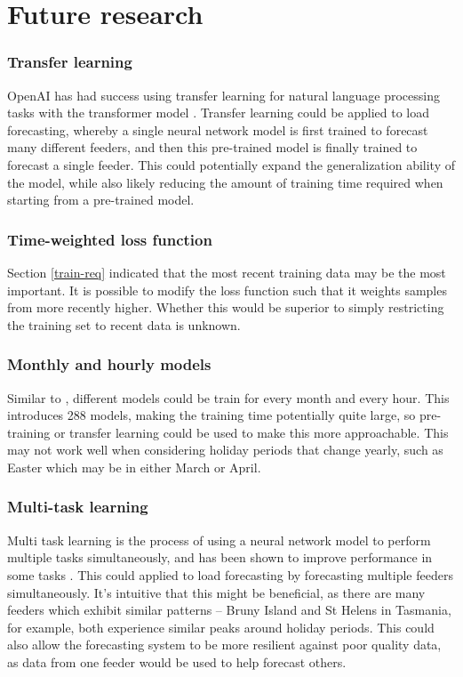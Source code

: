 \section{Future research}

\subsubsection{Transfer learning}
OpenAI has had success using transfer learning for natural language processing tasks with the transformer model \cite{radford2018improving}.
Transfer learning could be applied to load forecasting, whereby a single neural network model is first trained to forecast many different feeders, and then this pre-trained model is finally trained to forecast a single feeder.
This could potentially expand the generalization ability of the model, while also likely reducing the amount of training time required when starting from a pre-trained model.

\subsubsection{Time-weighted loss function}
Section \ref{train-req} indicated that the most recent training data may be the most important.
It is possible to modify the loss function such that it weights samples from more recently higher.
Whether this would be superior to simply restricting the training set to recent data is unknown.

\subsubsection{Monthly and hourly models}
Similar to \citet{Ceperic2013}, different models could be train for every month and every hour.
This introduces 288 models, making the training time potentially quite large, so pre-training or transfer learning could be used to make this more approachable.
This may not work well when considering holiday periods that change yearly, such as Easter which may be in either March or April.

\subsubsection{Multi-task learning}
Multi task learning is the process of using a neural network model to perform multiple tasks simultaneously, and has been shown to improve performance in some tasks \cite{Evgeniou2004}.
This could applied to load forecasting by forecasting multiple feeders simultaneously.
It's intuitive that this might be beneficial, as there are many feeders which exhibit similar patterns -- Bruny Island and St Helens in Tasmania, for example, both experience similar peaks around holiday periods.
This could also allow the forecasting system to be more resilient against poor quality data, as data from one feeder would be used to help forecast others.

